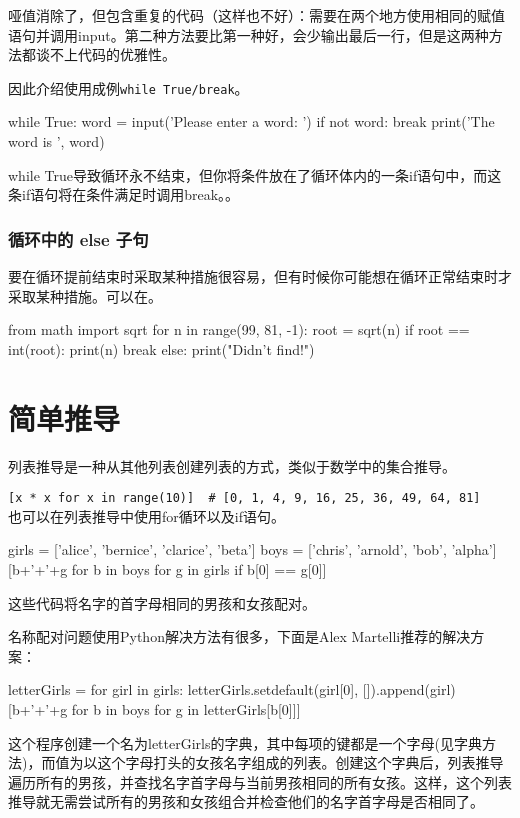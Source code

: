 哑值消除了，但包含重复的代码（这样也不好）：需要在两个地方使用相同的赋值语句并调用input。第二种方法要比第一种好，会少输出最后一行，但是这两种方法都谈不上代码的优雅性。

因此介绍使用成例\verb|while True/break|。
\begin{pyc}
while True:
word = input('Please enter a word: ')
if not word:
    break
print('The word is ', word)
\end{pyc}
while True导致循环永不结束，但你将条件放在了循环体内的一条if语句中，而这条if语句将在条件满足时调用break。。

\subsubsection{循环中的 else 子句} 
要在循环提前结束时采取某种措施很容易，但有时候你可能想在循环正常结束时才采取某种措施。可以在。
\begin{pyc}
from math import sqrt
for n in range(99, 81, -1):
    root = sqrt(n)
    if root == int(root):
        print(n)
        break
else:
    print("Didn't find!")
\end{pyc}
\section{简单推导}
列表推导是一种从其他列表创建列表的方式，类似于数学中的集合推导。

\verb|[x * x for x in range(10)]  # [0, 1, 4, 9, 16, 25, 36, 49, 64, 81]|\\
也可以在列表推导中使用for循环以及if语句。

\begin{pyc}
girls = ['alice', 'bernice', 'clarice', 'beta']
boys = ['chris', 'arnold', 'bob', 'alpha']
[b+'+'+g for b in boys for g in girls if b[0] == g[0]]
\end{pyc}
这些代码将名字的首字母相同的男孩和女孩配对。

\begin{tcolorbox}[title=优雅的配对代码, breakable]
名称配对问题使用Python解决方法有很多，下面是Alex Martelli推荐的解决方案：
\begin{pyc}
letterGirls = {}
for girl in girls:
    letterGirls.setdefault(girl[0], []).append(girl)
[b+'+'+g for b in boys for g in letterGirls[b[0]]]
\end{pyc}

这个程序创建一个名为letterGirls的字典，其中每项的键都是一个字母(见字典方法)，而值为以这个字母打头的女孩名字组成的列表。创建这个字典后，列表推导遍历所有的男孩，并查找名字首字母与当前男孩相同的所有女孩。这样，这个列表推导就无需尝试所有的男孩和女孩组合并检查他们的名字首字母是否相同了。
\end{tcolorbox}

